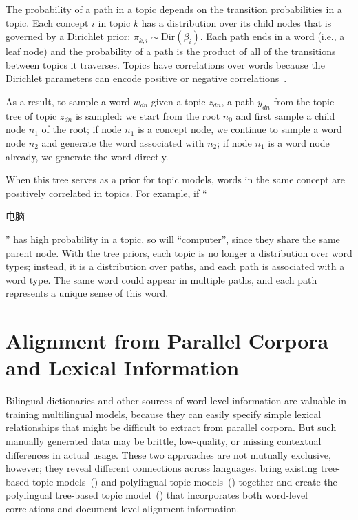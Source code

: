 The probability of a path in a topic depends on the transition
probabilities in a topic.  Each concept $i$ in topic $k$ has a
distribution over its child nodes that is governed by a Dirichlet prior:
$\pi_{k,i} \sim \text{Dir}(\beta_{i})$.  Each path ends in a word
(i.e., a leaf node) and the probability of a path is the product of
all of the transitions between topics it traverses. Topics have
correlations over words because the Dirichlet parameters can encode
positive or negative correlations~\citep{andrzejewski-09}.

As a result, to sample a word $w_{dn}$ given a topic $z_{dn}$, a path
$y_{dn}$ from the topic tree of topic $z_{dn}$ is sampled: we start
from the root $n_0$ and first sample a child node $n_1$ of the root;
if node $n_1$ is a concept node, we continue to sample a word node
$n_2$ and generate the word associated with $n_2$; if node $n_1$ is a
word node already, we generate the word directly.

When this tree serves as a prior for topic models, words in the same
concept are positively correlated in topics.  For example, if
``\begin{CJK*}{UTF8}{gbsn}电脑\end{CJK*}'' has high probability in a
  topic, so will ``computer'', since they share the same parent
  node. With the tree priors, each topic is no longer a distribution
  over word types; instead, it is a distribution over paths, and each
  path is associated with a word type.  The same word could appear in
  multiple paths, and each path represents a unique sense of this
  word.

\section{Alignment from Parallel Corpora and Lexical Information}

Bilingual dictionaries and other sources of word-level information are 
valuable in training multilingual models, because they can easily specify 
simple lexical relationships that might be difficult to extract from parallel corpora.
But such manually generated data may be brittle, low-quality, or missing contextual differences in actual usage.
These two approaches are not mutually exclusive, however; they reveal
different connections across languages. \citet{hu-14} bring existing
tree-based topic models~(\tlda{}) and polylingual topic
models~(\plda{}) together and create the polylingual tree-based topic
model~(\ptlda{}) that incorporates both word-level correlations and
document-level alignment information.

